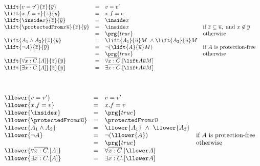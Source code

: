 $\begin{array}{lcll}
\lift {v=v'} {\overline z} {\overline y}  & = & v=v' 
\\
\lift {x.f=v} {\overline z} {\overline y} & = & x.f=v 
\\
\lift{ \inside x}  {\overline z} {\overline y}  & = &   \inside x 
\\
\lift{ \protectedFrom x {\overline {u}} }  {\overline z} {\overline y}  & = &   \inside x & \mbox{if } {\overline z}\subseteq {\overline {u}}, \mbox{ and } x\not\in \overline{y}
\\
   & = &   \prg{true} & \mbox{otherwise}

\\
\lift {A_1 \wedge A_2} {\overline z} {\overline y}  & = & \lift { A_1} {\overline u} M  \ \wedge \lift {A_2} {\overline u} M  
\\
\lift {\neg A} {\overline z} {\overline y}  & = & \neg (\lift {A} {\overline u} M)& \mbox{if  $A$ is protection-free}
\\
  & = &  \prg{true} & \mbox{otherwise}
\\
\lift {\forall \overline{x:C}.[ A ]} {\overline z} {\overline y}  & = & \forall \overline{x:C}.[ \lift A  {\overline u} M ] & 
\\
\lift {\exists \overline{x:C}.[ A ]} {\overline z} {\overline y}  & = & \exists \overline{x:C}.[ \lift A  {\overline u} M ] & 
\end{array}
$

$\begin{array}{lcll}
\\
\\
\llower {v=v'}   & = & v=v' 
\\
\llower {x.f=v}  & = & x.f=v 
\\
\llower{ \inside x}   & = &   \prg{true}
\\
\llower{ \protectedFrom x {\overline {u}} }    & = &     \protectedFrom x {\overline {u}}  
\\
\llower {A_1 \wedge A_2}   & = & \llower { A_1}   \ \wedge\ \llower {A_2}    
\\
\llower {\neg A}    & = & \neg (\llower  {A} ) & \mbox{if  $A$ is protection-free}
\\
  & = &  \prg{true} & \mbox{otherwise}
\\
\llower {\forall \overline{x:C}.[ A ]}    & = & \forall \overline{x:C}.[ \llower A    ] & 
\\
\llower {\exists \overline{x:C}.[ A ]}   & = & \exists \overline{x:C}.[ \llower A   ] & 
\end{array}
$

